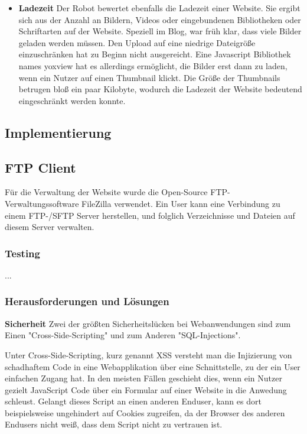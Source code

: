 {\begin{itemize}
      \item \textbf{Ladezeit}
        Der Robot bewertet ebenfalls die Ladezeit einer Website. Sie ergibt sich aus der Anzahl an Bildern, Videos oder eingebundenen Bibliotheken oder Schriftarten auf der Website.
        Speziell im Blog, war früh klar, dass viele Bilder geladen werden müssen. Den Upload auf eine niedrige Dateigröße einzuschränken hat zu Beginn nicht ausgereicht.
        Eine Javascript Bibliothek names yoxview hat es allerdings ermöglicht, die Bilder erst dann zu laden, wenn ein Nutzer auf einen Thumbnail klickt. Die Größe der Thumbnails betrugen bloß
        ein paar Kilobyte, wodurch die Ladezeit der Website bedeutend eingeschränkt werden konnte.
    \end{itemize}

  \subsection{Implementierung}

    \subsection{FTP Client}
    Für die Verwaltung der Website wurde die Open-Source FTP-Verwaltungssoftware FileZilla verwendet. Ein User kann eine Verbindung zu einem FTP-/SFTP
    Server herstellen, und folglich Verzeichnisse und Dateien auf diesem Server verwalten.

    \subsubsection{Testing}
    ...

    \subsubsection{Herausforderungen und Lösungen}
    \textbf{Sicherheit}
    Zwei der größten Sicherheitslücken bei Webanwendungen sind zum Einen {"Cross-Side-Scripting"\cite{xss}} und zum Anderen {"SQL-Injections"\cite{sqlinjections}}.

    Unter Cross-Side-Scripting, kurz genannt XSS versteht man die Injizierung von schadhaftem Code in eine Webapplikation über eine Schnittstelle, zu der ein User
    einfachen Zugang hat. In den meisten Fällen geschieht dies, wenn ein Nutzer gezielt JavaScript Code über ein Formular auf einer Website in die Anwedung schleust.
    Gelangt dieses Script an einen anderen Enduser, kann es dort beispielsweise ungehindert auf Cookies zugreifen, da der Browser des anderen Endusers nicht weiß,
    dass dem Script nicht zu vertrauen ist.

}

